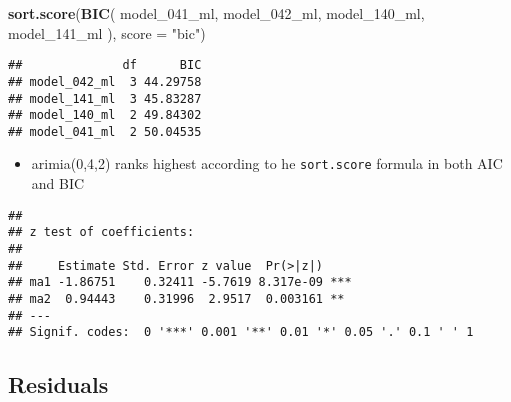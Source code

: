 \documentclass[]{article}
\newenvironment{Shaded}{\begin{snugshade}}{\end{snugshade}}
\newcommand{\CommentTok}[1]{\textcolor[rgb]{0.56,0.35,0.01}{\textit{#1}}}
\newcommand{\DataTypeTok}[1]{\textcolor[rgb]{0.13,0.29,0.53}{#1}}
\newcommand{\DecValTok}[1]{\textcolor[rgb]{0.00,0.00,0.81}{#1}}
\newcommand{\KeywordTok}[1]{\textcolor[rgb]{0.13,0.29,0.53}{\textbf{#1}}}
\newcommand{\NormalTok}[1]{#1}
\newcommand{\OperatorTok}[1]{\textcolor[rgb]{0.81,0.36,0.00}{\textbf{#1}}}
\newcommand{\StringTok}[1]{\textcolor[rgb]{0.31,0.60,0.02}{#1}}
\providecommand{\tightlist}{%
  \setlength{\itemsep}{0pt}\setlength{\parskip}{0pt}}
\begin{document}
\begin{Shaded}
\begin{Highlighting}[]
\KeywordTok{sort.score}\NormalTok{(}\KeywordTok{BIC}\NormalTok{(}
\NormalTok{  model_}\DecValTok{041}\NormalTok{_ml, model_}\DecValTok{042}\NormalTok{_ml, model_}\DecValTok{140}\NormalTok{_ml, model_}\DecValTok{141}\NormalTok{_ml ),}
  \DataTypeTok{score =} \StringTok{"bic"}\NormalTok{)}
\end{Highlighting}
\end{Shaded}

\begin{verbatim}
##              df      BIC
## model_042_ml  3 44.29758
## model_141_ml  3 45.83287
## model_140_ml  2 49.84302
## model_041_ml  2 50.04535
\end{verbatim}

\begin{itemize}
\tightlist
\item
  arimia(0,4,2) ranks highest according to he \texttt{sort.score}
  formula in both AIC and BIC
\end{itemize}

\begin{Shaded}
\end{Shaded}

\begin{verbatim}
## 
## z test of coefficients:
## 
##     Estimate Std. Error z value  Pr(>|z|)    
## ma1 -1.86751    0.32411 -5.7619 8.317e-09 ***
## ma2  0.94443    0.31996  2.9517  0.003161 ** 
## ---
## Signif. codes:  0 '***' 0.001 '**' 0.01 '*' 0.05 '.' 0.1 ' ' 1
\end{verbatim}

\hypertarget{residuals}{%
\subsection{Residuals}\label{residuals}}
\end{document}
